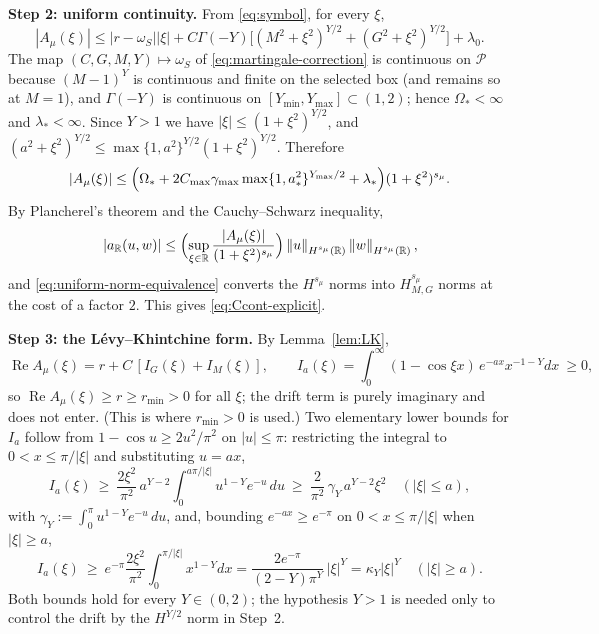 \documentclass[supplement,hidelinks]{siamart251216}
\newcommand{\R}{\mathbb{R}}
\newcommand{\Pset}{\mathcal{P}}
\newcommand{\norm}[1]{\left\lVert #1\right\rVert}
\newcommand{\rf}{r}
\DeclareMathOperator{\Real}{Re}
\begin{document}
\medskip\noindent
\textbf{Step 2: uniform continuity.}
From \eqref{eq:symbol}, for every $\xi$,
\[
  |A_\mu(\xi)|
  \le|\rf-\omega_S||\xi|
   +C\Gamma(-Y)\bigl[(M^2+\xi^2)^{Y/2}+(G^2+\xi^2)^{Y/2}\bigr]
   +\lambda_0 .
\]
The map $(C,G,M,Y)\mapsto\omega_S$ of \eqref{eq:martingale-correction} is
continuous on $\Pset$ because $(M-1)^Y$ is continuous and finite on the selected box
(and remains so at $M=1$), and $\Gamma(-Y)$ is continuous on $[Y_{\min},Y_{\max}]\subset(1,2)$;
hence $\Omega_\ast<\infty$ and $\lambda_\ast<\infty$.  Since $Y>1$ we have
$|\xi|\le(1+\xi^2)^{Y/2}$, and
$(a^2+\xi^2)^{Y/2}\le\max\{1,a^2\}^{Y/2}(1+\xi^2)^{Y/2}$.  Therefore
\begin{equation}
  |A_\mu(\xi)|
  \le\Bigl(\Omega_\ast+2C_{\max}\gamma_{\max}\max\{1,a_\ast^2\}^{Y_{\max}/2}
   +\lambda_\ast\Bigr)(1+\xi^2)^{s_\mu}.
  \label{eq:uniform-symbol-upper}
\end{equation}
By Plancherel's theorem and the Cauchy--Schwarz inequality,
\[
  |a_\R(u,w)|
  \le\Bigl(\sup_{\xi\in\R}\frac{|A_\mu(\xi)|}{(1+\xi^2)^{s_\mu}}\Bigr)
  \norm{u}_{H^{s_\mu}(\R)}\norm{w}_{H^{s_\mu}(\R)},
\]
and
\eqref{eq:uniform-norm-equivalence} converts the $H^{s_\mu}$ norms into
$H^{s_\mu}_{M,G}$ norms at the cost of a factor $2$.  This gives
\eqref{eq:Ccont-explicit}.


\medskip\noindent
\textbf{Step 3: the L\'evy--Khintchine form.}
By Lemma~\ref{lem:LK},
\begin{equation}
  \Real A_\mu(\xi)=\rf+C\,[I_G(\xi)+I_M(\xi)],\qquad
  I_a(\xi)=\int_0^\infty(1-\cos\xi x)\,e^{-ax}x^{-1-Y}dx\ \ge0,
  \label{eq:uniform-low-freq}
\end{equation}
so $\Real A_\mu(\xi)\ge \rf\ge r_{\min}>0$ for all $\xi$; the drift term is purely
imaginary and does not enter.  (This is where $r_{\min}>0$ is used.)  Two elementary
lower bounds for $I_a$ follow from $1-\cos u\ge 2u^2/\pi^2$ on $|u|\le\pi$: restricting the
integral to $0<x\le\pi/|\xi|$ and substituting $u=ax$,
\begin{equation}
  I_a(\xi)\ \ge\ \frac{2\xi^2}{\pi^2}\,a^{Y-2}\!\int_0^{a\pi/|\xi|}\!u^{1-Y}e^{-u}\,du
  \ \ge\ \frac{2}{\pi^2}\,\gamma_Y\,a^{Y-2}\xi^2\quad(|\xi|\le a),
  \label{eq:LK-low}
\end{equation}
with $\gamma_Y:=\int_0^\pi u^{1-Y}e^{-u}\,du$, and, bounding $e^{-ax}\ge e^{-\pi}$ on $0<x\le\pi/|\xi|$ when $|\xi|\ge a$,
\begin{equation}
  I_a(\xi)\ \ge\ e^{-\pi}\frac{2\xi^2}{\pi^2}\int_0^{\pi/|\xi|}x^{1-Y}dx
  =\frac{2e^{-\pi}}{(2-Y)\pi^{Y}}\,|\xi|^{Y}=\kappa_Y|\xi|^Y\quad(|\xi|\ge a).
  \label{eq:LK-high}
\end{equation}
Both bounds hold for every $Y\in(0,2)$; the hypothesis $Y>1$ is needed only to
control the drift by the $H^{Y/2}$ norm in Step~2.
\end{document}
